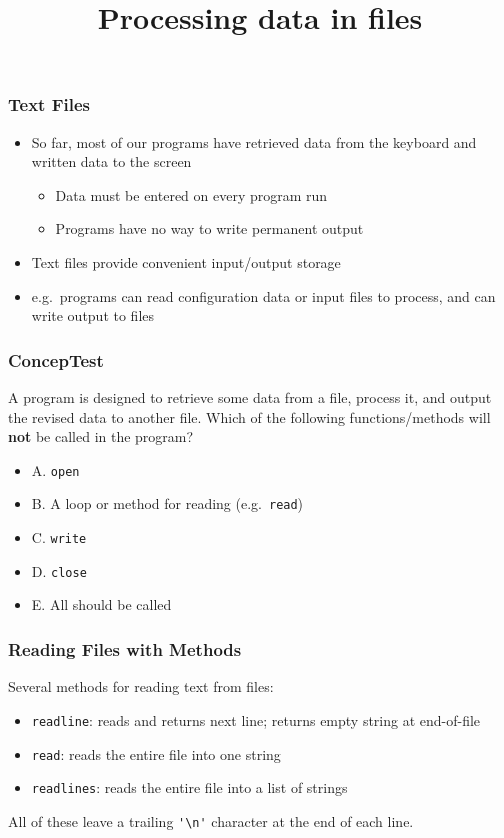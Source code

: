 \documentclass{beamer}
\title{Processing data in files}
\begin{document}

\begin{frame}
\titlepage
\end{frame}


\begin{frame}[fragile]
\frametitle{Text Files}
\begin{itemize}
\item So far, most of our programs have retrieved data from the keyboard and written data to the screen
\begin{itemize}
\item Data must be entered on every program run
\item Programs have no way to write permanent output
\end{itemize}
\item Text files provide convenient input/output storage
\item e.g.\ programs can read configuration data or input files to process, and can write output to files
\end{itemize}
\end{frame}

\begin{frame}[fragile]
\frametitle{ConcepTest}
A program is designed to retrieve some data from a file, process it, and output the revised data to another file. Which of the following functions/methods will {\bf not} be called in the program?

\begin{itemize}
\item A. \verb|open|
\item B. A loop or method for reading (e.g.\ \verb|read|)
\item C. \verb|write|
\item D. \verb|close|
\item E. All should be called
\end{itemize}
\end{frame}

\begin{frame}[fragile]
\frametitle{Reading Files with Methods}
Several methods for reading text from files:
\begin{itemize}
\item \verb|readline|: reads and returns next line; returns empty string at end-of-file
\item \verb|read|: reads the entire file into one string
\item \verb|readlines|: reads the entire file into a list of strings
\end{itemize}

All of these leave a trailing \verb|'\n'| character at the end of each line.
\end{frame}
\end{document}
